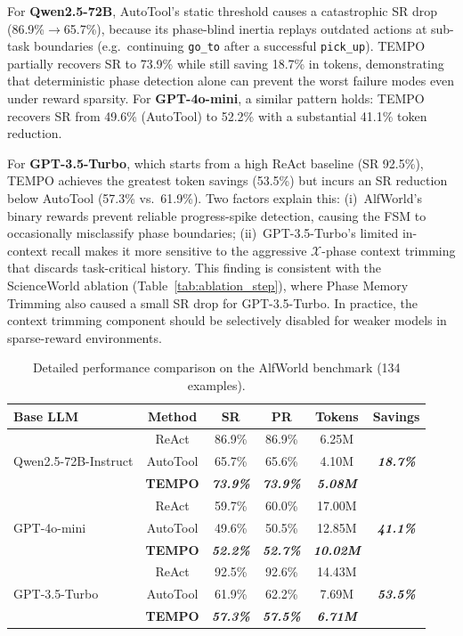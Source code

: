\documentclass[runningheads]{llncs}
\begin{document}
For \textbf{Qwen2.5-72B}, AutoTool's static threshold causes a catastrophic SR drop (86.9\%$\to$65.7\%), because its phase-blind inertia replays outdated actions at sub-task boundaries (e.g.\ continuing \texttt{go\_to} after a successful \texttt{pick\_up}). TEMPO partially recovers SR to 73.9\% while still saving 18.7\% in tokens, demonstrating that deterministic phase detection alone can prevent the worst failure modes even under reward sparsity. For \textbf{GPT-4o-mini}, a similar pattern holds: TEMPO recovers SR from 49.6\% (AutoTool) to 52.2\% with a substantial 41.1\% token reduction.

For \textbf{GPT-3.5-Turbo}, which starts from a high ReAct baseline (SR 92.5\%), TEMPO achieves the greatest token savings (53.5\%) but incurs an SR reduction below AutoTool (57.3\% vs.\ 61.9\%). Two factors explain this: (i)~AlfWorld's binary rewards prevent reliable progress-spike detection, causing the FSM to occasionally misclassify phase boundaries; (ii)~GPT-3.5-Turbo's limited in-context recall makes it more sensitive to the aggressive $\mathcal{X}$-phase context trimming that discards task-critical history. This finding is consistent with the ScienceWorld ablation (Table~\ref{tab:ablation_step}), where Phase Memory Trimming also caused a small SR drop for GPT-3.5-Turbo. In practice, the context trimming component should be selectively disabled for weaker models in sparse-reward environments.

\begin{table}[htb]
\centering
\small
\caption{Detailed performance comparison on the AlfWorld benchmark (134 examples).}
\label{tab:alfworld_detailed}
\vspace{2mm}
\begin{tabular}{lccccc}
\toprule
\textbf{Base LLM} & \textbf{Method} & \textbf{SR} & \textbf{PR} & \textbf{Tokens} & \textbf{Savings}\\
\midrule
\multirow{3}{*}{Qwen2.5-72B-Instruct} & ReAct & 86.9\% & 86.9\% & 6.25M & \multirow{3}{*}{\textsl{\textbf{18.7\%}}} \\
& AutoTool & 65.7\% & 65.6\% & 4.10M & \\
& \textbf{TEMPO} & \textsl{\textbf{73.9\%}} & \textsl{\textbf{73.9\%}} & \textsl{\textbf{5.08M}} & \\
\midrule
\multirow{3}{*}{GPT-4o-mini} & ReAct & 59.7\% & 60.0\% & 17.00M & \multirow{3}{*}{\textsl{\textbf{41.1\%}}}\\
& AutoTool & 49.6\% & 50.5\% & 12.85M & \\
& \textbf{TEMPO} & \textsl{\textbf{52.2\%}} & \textsl{\textbf{52.7\%}} & \textsl{\textbf{10.02M}} & \\
\midrule
\multirow{3}{*}{GPT-3.5-Turbo} & ReAct & 92.5\% & 92.6\% & 14.43M & \multirow{3}{*}{\textsl{\textbf{53.5\%}}}\\
& AutoTool & 61.9\% & 62.2\% & 7.69M & \\
& \textbf{TEMPO} & \textsl{\textbf{57.3\%}} & \textsl{\textbf{57.5\%}} & \textsl{\textbf{6.71M}} & \\
\bottomrule
\end{tabular}
\end{table}
\end{document}
